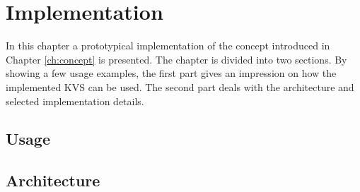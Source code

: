 \chapter{Implementation}
\label{ch:impl}

In this chapter a prototypical implementation of the concept introduced in Chapter \ref{ch:concept} is presented. The chapter is divided into two sections. By showing a few usage examples, the first part gives an impression on how the implemented KVS can be used. The second part deals with the architecture and selected implementation details.


\section{Usage}
\label{ch:impl-usage}


\section{Architecture}
\label{ch:impl-arch}

